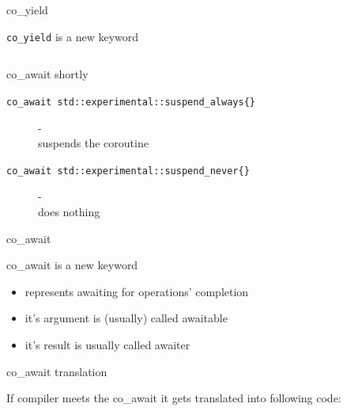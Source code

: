 \documentclass[10pt]{beamer}
\newcommand{\code}[1]{\texttt{#1}}
\begin{document}
\begin{frame}[fragile]{co\_yield}
\centerline{\alert{\code{co\_yield}} is a new keyword}

\begin{columns}

\end{columns}
\end{frame}

\begin{frame}{co\_await shortly}
\begin{description}
  \item[\code{co\_await std::experimental::suspend\_always\{\}}] - \hfill \\ suspends the coroutine
  \item[\code{co\_await std::experimental::suspend\_never\{\}}] - \hfill \\ does nothing
\end{description}

\end{frame}

\begin{frame}{co\_await}
\centerline{\alert{co\_await} is a new keyword}

\begin{itemize}
  \item represents awaiting for operations' completion
  \item it's argument is (usually) called awaitable
  \item it's result is usually called awaiter
\end{itemize}
\end{frame}

\begin{frame}{co\_await translation}
\centerline{If compiler meets the co\_await it gets translated into following code:}

\inputminted{c++}{code-examples/theory-custom-coroutine/co-await-transformation.cpp}
\end{frame}
\end{document}
